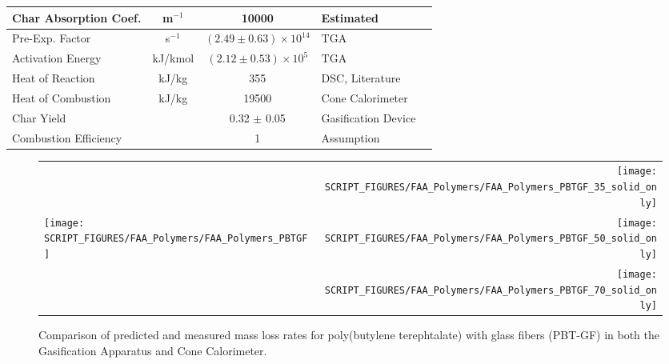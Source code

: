 \begin{table}[h!]
\begin{center}
\begin{tabular}{|l|c|c|l|l|}
Char Absorption Coef.   &      m$^{-1}$ &       10000                       & Estimated                                 & \cite{Kempel:1}               \\ \hline
Pre-Exp. Factor         &      s$^{-1}$ & $(2.49 \pm 0.63) \times 10^{14}$  & TGA                                       & \cite{Kempel:1}               \\ \hline
Activation Energy       &    kJ/kmol    & $(2.12 \pm 0.53) \times 10^{5}$   & TGA                                       & \cite{Kempel:1}               \\ \hline
Heat of Reaction        &      kJ/kg    &        355                        & DSC, Literature                           & \cite{Kempel:1,Lyon:Ency2005} \\ \hline
Heat of Combustion      &      kJ/kg    & 19500                             & Cone Calorimeter                          & \cite{Kempel:1}               \\ \hline
Char Yield              &               & 0.32 $\pm$ 0.05                   & Gasification Device                       & \cite{Kempel:1}               \\ \hline
Combustion Efficiency   &               &          1                        & Assumption                                & \cite{Kempel:1}               \\ \hline
\end{tabular}
\end{center}
\label{Properties_PBT-GF}
\end{table}

\begin{figure}[h!]
\begin{tabular*}{\textwidth}{l@{\extracolsep{\fill}}r}
 &
\texttt{[image: SCRIPT\_FIGURES/FAA\_Polymers/FAA\_Polymers\_PBTGF\_35\_solid\_only]} \\
\texttt{[image: SCRIPT\_FIGURES/FAA\_Polymers/FAA\_Polymers\_PBTGF]} &
\texttt{[image: SCRIPT\_FIGURES/FAA\_Polymers/FAA\_Polymers\_PBTGF\_50\_solid\_only]} \\
 &
\texttt{[image: SCRIPT\_FIGURES/FAA\_Polymers/FAA\_Polymers\_PBTGF\_70\_solid\_only]}
\end{tabular*}
\caption[Mass loss rate of poly(butylene terephtalate) with glass fibers (PBT-GF).]
{Comparison of predicted and measured mass loss rates for poly(butylene terephtalate) with glass fibers (PBT-GF) in both the Gasification Apparatus and Cone Calorimeter.}
\label{HRR_PBTGF}
\end{figure}


